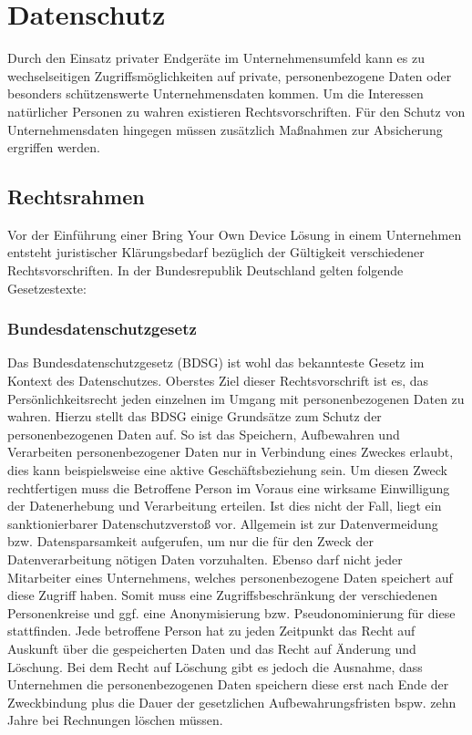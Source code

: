 \chapter{Datenschutz}

Durch den Einsatz privater Endgeräte im Unternehmensumfeld kann es zu wechselseitigen Zugriffsmöglichkeiten auf private, personenbezogene Daten oder besonders schützenswerte Unternehmensdaten kommen. 
Um die Interessen natürlicher Personen zu wahren existieren Rechtsvorschriften. Für den Schutz von Unternehmensdaten hingegen müssen zusätzlich Maßnahmen zur Absicherung ergriffen werden.


\section {Rechtsrahmen}
Vor der Einführung einer Bring Your Own Device Lösung in einem Unternehmen entsteht juristischer Klärungsbedarf bezüglich der Gültigkeit verschiedener Rechtsvorschriften. In der Bundesrepublik Deutschland gelten folgende Gesetzestexte:
\subsection{Bundesdatenschutzgesetz}
Das Bundesdatenschutzgesetz  (BDSG) ist wohl das bekannteste Gesetz im Kontext des Datenschutzes. Oberstes Ziel  dieser Rechtsvorschrift ist es, das Persönlichkeitsrecht jeden einzelnen im Umgang mit personenbezogenen Daten zu wahren. Hierzu stellt das BDSG einige Grundsätze zum Schutz der personenbezogenen Daten auf. So ist das Speichern, Aufbewahren und Verarbeiten personenbezogener Daten nur in Verbindung eines Zweckes erlaubt, dies kann beispielsweise eine aktive Geschäftsbeziehung sein. Um diesen Zweck rechtfertigen muss die Betroffene Person im Voraus eine wirksame Einwilligung der Datenerhebung und Verarbeitung erteilen. Ist dies nicht der Fall, liegt ein sanktionierbarer Datenschutzverstoß vor. Allgemein ist zur Datenvermeidung bzw. Datensparsamkeit aufgerufen, um nur die für den Zweck der Datenverarbeitung nötigen Daten vorzuhalten. Ebenso darf nicht jeder Mitarbeiter eines Unternehmens, welches personenbezogene Daten speichert auf diese Zugriff haben. Somit muss eine Zugriffsbeschränkung der verschiedenen Personenkreise und ggf. eine Anonymisierung bzw. Pseudonominierung für diese stattfinden. Jede betroffene Person hat zu jeden Zeitpunkt das Recht auf Auskunft über die gespeicherten Daten und das Recht auf Änderung und Löschung. Bei dem Recht auf Löschung gibt es jedoch die Ausnahme, dass Unternehmen die personenbezogenen Daten speichern diese erst nach Ende der Zweckbindung plus die Dauer der gesetzlichen Aufbewahrungsfristen bspw. zehn Jahre bei Rechnungen löschen müssen. 

